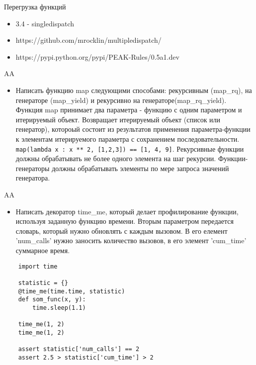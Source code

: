 \documentclass{article}
\begin{document}
\begin{center} Перегрузка функций \end{center}
\begin{itemize}
    \item 3.4 - singledispatch
    \item https://github.com/mrocklin/multipledispatch/
    \item https://pypi.python.org/pypi/PEAK-Rules/0.5a1.dev
\end{itemize}
\newpage

\begin{center} AA \end{center}
\begin{itemize}
    \item Написать функцию map следующими способами: рекурсивным (map\_rq), 
        на генераторе (map\_yield) и рекурсивно на генераторе(map\_rq\_yield).
        Функция map принимает два параметра - функцию с одним параметром и итерируемый объект. 
        Возвращает итерируемый объект (список или генератор), котороый состоит из результатов
        применения параметра-функции к элементам итерируемого параметра с сохранением последовательности.
        \lstinline!map(lambda x : x ** 2, [1,2,3]) == [1, 4, 9]!.
        Рекурсивные функции должны обрабатывать не более одного элемента на шаг рекурсии.
        Функции-генераторы должны обрабатывать элементы по мере запроса значений генератора.
\end{itemize}
\newpage

\begin{center} AA \end{center}
\begin{itemize}
    \item Написать декоратор time\_me, который делает профилирование функции, 
        используя заданную функцию времени. Вторым параметром передается словарь,
        который нужно обновлять с каждым вызовом. В его елемент 'num\_calls' нужно
        заносить количество вызовов, в его элемент 'cum\_time' суммарное время.
\end{itemize}
\vspace{15pt}
\begin{lstlisting}
    import time

    statistic = {}
    @time_me(time.time, statistic)
    def som_func(x, y):
        time.sleep(1.1)

    time_me(1, 2)
    time_me(1, 2)

    assert statistic['num_calls'] == 2
    assert 2.5 > statistic['cum_time'] > 2
\end{lstlisting}
\newpage
\end{document}
